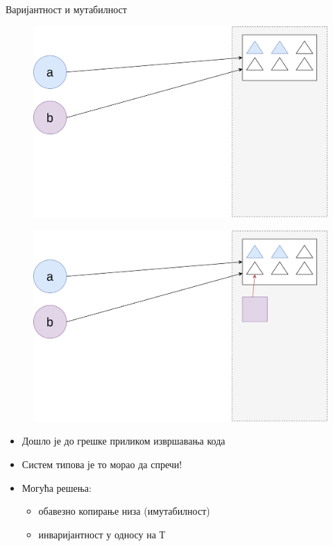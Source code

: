 \documentclass[xcolor=table]{beamer}
\begin{document}
\begin{frame}[allowframebreaks]{Варијантност и мутабилност}
        \framebreak
        
        \begin{figure}
            \centering
            \includegraphics[height=0.7\textheight,keepaspectratio]{images/arr1.png}
        \end{figure}
        
        \framebreak
        
        \begin{figure}
            \centering
            \includegraphics[height=0.7\textheight,keepaspectratio]{images/arr2.png}
        \end{figure}
        
        \framebreak
        
        \begin{itemize}
            \item Дошло је до грешке приликом извршавања кода
            \item Систем типова је то морао да спречи!
            \item Могућа решења:
            \begin{itemize}
                \item обавезно копирање низа (имутабилност)
                \item инваријантност у односу на Т
            \end{itemize}
        \end{itemize}
        

\end{frame}
\end{document}
